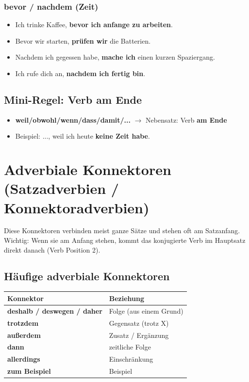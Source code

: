 \documentclass[a4paper,12pt]{article}
\begin{document}
            \subsubsection{bevor / nachdem (Zeit)}
            \begin{itemize}[leftmargin=2em]
					\item Ich trinke Kaffee, \textbf{bevor ich anfange zu arbeiten}.
                    \item Bevor wir starten, \textbf{pr\"ufen wir} die Batterien.
                    \item Nachdem ich gegessen habe, \textbf{mache ich} einen kurzen Spaziergang.
                    \item Ich rufe dich an, \textbf{nachdem ich fertig bin}.
                \end{itemize}
        
        \subsection{Mini-Regel: Verb am Ende}
            \begin{itemize}[leftmargin=2em]
				\item \textbf{weil/obwohl/wenn/dass/damit/...} \(\rightarrow\) Nebensatz: Verb \textbf{am Ende}
                \item Beispiel: ..., weil ich heute \textbf{keine Zeit habe}.
            \end{itemize}
    
    
    \section{Adverbiale Konnektoren (Satzadverbien / Konnektoradverbien)}
        Diese Konnektoren verbinden meist ganze S\"atze und stehen oft am Satzanfang.
        Wichtig: Wenn sie am Anfang stehen, kommt das konjugierte Verb im Hauptsatz direkt danach (Verb Position 2).
        
        \subsection{H\"aufige adverbiale Konnektoren}
            \begin{longtable}{@{}ll@{}}
                \toprule
                Konnektor & Beziehung \\
                \midrule
                \endhead
                \textbf{deshalb / deswegen / daher} & Folge (aus einem Grund) \\
                \textbf{trotzdem} & Gegensatz (trotz X) \\
                \textbf{au\ss erdem} & Zusatz / Ergänzung \\
                \textbf{dann} & zeitliche Folge \\
                \textbf{allerdings} & Einschr\"ankung \\
                \textbf{zum Beispiel} & Beispiel \\
                \bottomrule
            \end{longtable}
        
\end{document}
